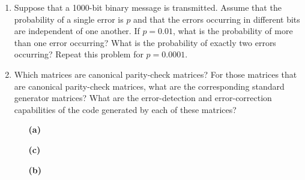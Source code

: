 {\begin{enumerate}
 
\item
Suppose that a 1000-bit binary message is transmitted. Assume that the
probability of a single error is $p$ and that the errors occurring in
different bits are independent of one another. If $p = 0.01$, what is
the probability of more than one error occurring? What is the
probability of exactly two errors occurring?  Repeat this problem for
$p = 0.0001$.
 
 
\item
Which matrices are canonical parity-check matrices? For those matrices
that are canonical parity-check matrices, what are the corresponding
standard generator matrices? What are the error-detection and
error-correction capabilities of the code generated by each of these
matrices? 
 
 
\vspace{3pt}        %
 
\hspace{-7pt}
\begin{minipage}[t]{4.6in}
\noindent
\begin{minipage}[t]{2.25in}
\begin{itemize}
 
 \item[{\bf (a)}]
 
 \item[{\bf (c)}]
 
\end{itemize}
\end{minipage} \hfill
\begin{minipage}[t]{2.25in}
\begin{itemize}
 
 \item[{\bf (b)}]
 

\end{itemize}
\end{minipage}
\end{minipage}
\end{enumerate}}
